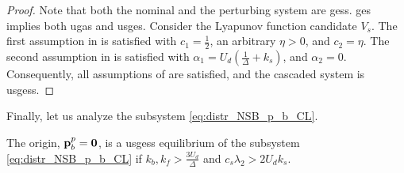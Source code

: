 \begin{proof}
    Note that both the nominal and the perturbing system are \glspl{ges}.
    \gls{ges} implies both \gls{ugas} and \gls{usges}.
    Consider the Lyapunov function candidate $V_s$.
    The first assumption in \cite[Proposition 9]{pettersen_lyapunov_2017} is satisfied with $c_1 = \frac{1}{2}$, an arbitrary $\eta > 0$, and $c_2 = \eta$.
    The second assumption in \cite[Proposition 9]{pettersen_lyapunov_2017} is satisfied with $\alpha_1 = U_d \left(\frac{1}{\Delta} + k_s\right)$, and $\alpha_2 = 0$.
    Consequently, all assumptions of \cite[Proposition 9]{pettersen_lyapunov_2017} are satisfied, and the cascaded system is \glspl{usges}.
\end{proof}

Finally, let us analyze the subsystem \eqref{eq:distr_NSB_p_b_CL}.
\begin{lemma}
    \label{lemma3}
    The origin, $\mathbf{p}_b^p = \mathbf{0}$, is a \glspl{usges} equilibrium of the subsystem \eqref{eq:distr_NSB_p_b_CL} if $k_b, k_f > \frac{3U_d}{\Delta}$ and $c_s \lambda_2 > 2 U_d k_s$.
\end{lemma}
